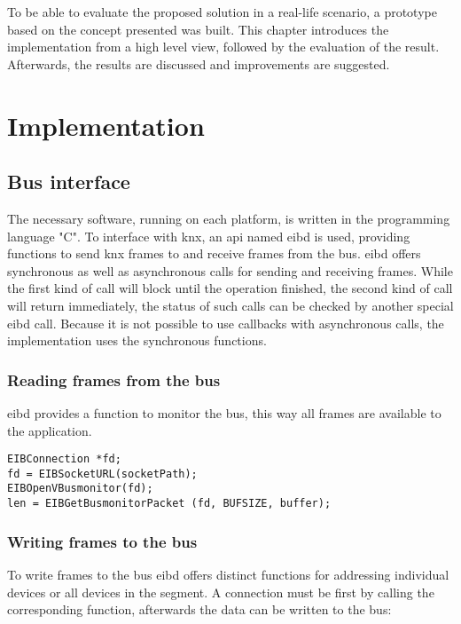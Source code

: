 \label{chap6}
To be able to evaluate the proposed solution in a real-life scenario, a prototype based on the concept presented was built. This chapter introduces the implementation from a high level
view, followed by the evaluation of the result. Afterwards, the results are discussed and improvements are suggested.
\section{Implementation}

\subsection{Bus interface}
The necessary software, running on each platform, is written in the programming language "C". To interface with \gls{knx}, an \gls{api} named \gls{eibd} is used, providing functions to
send \gls{knx} frames to and receive frames from the bus. \gls{eibd} offers synchronous as well as asynchronous calls for sending and receiving frames. While the first kind of
call will block until the operation finished, the second kind of call will return immediately, the status of such calls can be checked by another special \gls{eibd} call.
Because it is not possible to use callbacks with asynchronous calls, the implementation uses the synchronous functions.

\subsubsection{Reading frames from the bus}
\gls{eibd} provides a function to monitor the bus, this way all frames are available to the application.

\begin{lstlisting}[style=cStyle,caption={Reading \gls{knx} frames},label=lst:busMon]
EIBConnection *fd;
fd = EIBSocketURL(socketPath);
EIBOpenVBusmonitor(fd);
len = EIBGetBusmonitorPacket (fd, BUFSIZE, buffer);
\end{lstlisting}

\subsubsection{Writing frames to the bus}
To write frames to the bus \gls{eibd} offers distinct functions for addressing individual devices or all devices in the segment. A connection must be first by calling the corresponding
function, afterwards the data can be written to the bus:

